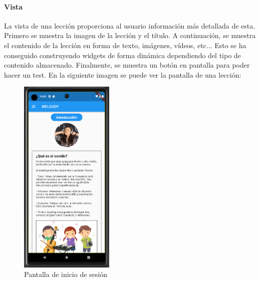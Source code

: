 \label{sec:leccion}
\paragraph*{Vista}
La vista de una lección proporciona al usuario información más detallada de esta. Primero se muestra la imagen de la lección y el título. A continuación, 
se muestra el contenido de la lección en forma de texto, imágenes, vídeos, etc... Esto se ha conseguido construyendo widgets de forma dinámica dependiendo del tipo
de contenido almacenado. Finalmente, se muestra un botón en pantalla para poder hacer un test. En la siguiente imagen se puede ver la pantalla de una lección:

\begin{figure}[H]
  \centering
  \includegraphics[width=0.4\textwidth]{imagenes/c7/leccion.png}
  \caption{Pantalla de inicio de sesión}
  \label{fig:login}
\end{figure}

